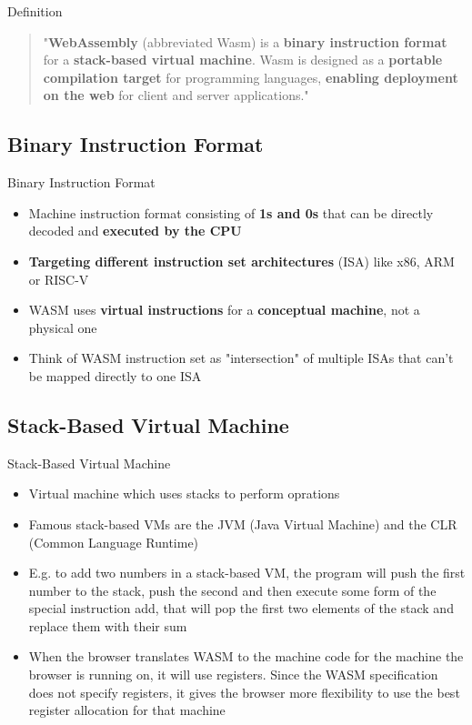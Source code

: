 \documentclass{beamer}
\begin{document}
\begin{frame}{Definition}
    \begin{quotation}
        "\textbf{WebAssembly} (abbreviated Wasm) is a \textbf{binary instruction format} for a \textbf{stack-based virtual machine}. Wasm is designed as a \textbf{portable compilation target} for programming languages, \textbf{enabling deployment on the web} for client and server applications."
    \end{quotation}
\end{frame}

\subsection{Binary Instruction Format}

\begin{frame}{Binary Instruction Format}
    \begin{itemize}
        \item Machine instruction format consisting of \textbf{1s and 0s} that can be directly decoded and \textbf{executed by the CPU}
        \item \textbf{Targeting different instruction set architectures} (ISA) like x86, ARM or RISC-V
        \item WASM uses \textbf{virtual instructions} for a \textbf{conceptual machine}, not a physical one
        \item Think of WASM instruction set as "intersection" of multiple ISAs that can't be mapped directly to one ISA
    \end{itemize}
\end{frame}

\subsection{Stack-Based Virtual Machine}

\begin{frame}{Stack-Based Virtual Machine}
    \begin{itemize}
        \item Virtual machine which uses stacks to perform oprations
        \item Famous stack-based VMs are the JVM (Java Virtual Machine) and the CLR (Common Language Runtime)
        \item E.g. to add two numbers in a stack-based VM, the program will push the first number to the stack, push the second and then execute some form of the special instruction add, that will pop the first two elements of the stack and replace them with their sum
        \item When the browser translates WASM to the machine code for the machine the browser is running on, it will use registers. Since the WASM specification does not specify registers, it gives the browser more flexibility to use the best register allocation for  that machine
    \end{itemize}
\end{frame}
\end{document}
